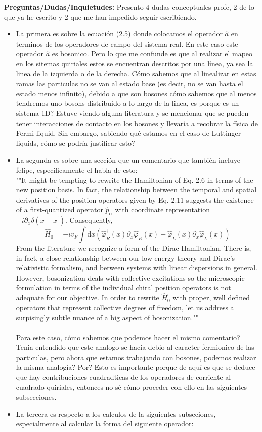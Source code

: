     
\textcolor{UVred}{\textbf{Preguntas/Dudas/Inquietudes:}}
Presento 4 dudas conceptuales profe, 2 de lo que ya he escrito y 2 que me han impedido seguir escribiendo.
\begin{itemize}
    \item La primera es sobre la ecuación (2.5) donde colocamos el operador $\hat{a}$ en terminos de los operadores de campo del sistema real. En este caso este operador $\hat{a}$ es bosonico. Pero lo que me confunde es que al realizar el mapeo en los sitemas quiriales estos se encuentran descritos por una línea, ya sea la linea de la izquierda o de la derecha. Cómo sabemos que al linealizar en estas ramas las particulas no se van al estado base (es decir, no se van hasta el estado menos infinito), debido a que son bosones cómo sabemos que al menos tendremos uno bosons distribuido a lo largo de la linea, es porque es un sistema 1D? Estuve viendo alguna literatura y se mencionar que se pueden tener interacciones de contacto en los bosones y llevaría a recobrar la física de Fermi-liquid. Sin embargo, sabiendo qué estamos en el caso de Luttinger liquids, cómo se podría justificar esto?
    \item  La segunda es sobre una sección que un comentario que también incluye felipe, especificamente el habla de esto:\\
""It might be tempting to rewrite the Hamiltonian of Eq. 2.6 in terms of the new position basis. In fact, the relationship between the temporal and spatial derivatives of the position operators given by Eq. 2.11 suggests the existence of a first-quantized operator $\hat{p}_{\alpha}$ with coordinate representation $-i \partial_{x} \delta\left(x-x^{\prime}\right)$. Consequently,
$$
\hat{H}_{0}=-i v_{F} \int \mathrm{d} x\left(\hat{\varphi}_{R}^{\dagger}(x) \partial_{x} \hat{\varphi}_{R}(x)-\hat{\varphi}_{L}^{\dagger}(x) \partial_{x} \hat{\varphi}_{L}(x)\right)
$$
From the literature we recognize a form of the Dirac Hamiltonian. There is, in fact, a close relationship between our low-energy theory and Dirac's relativistic formalism, and between systems with linear dispersions in general. However, bosonization deals with collective excitations so the microscopic formulation in terms of the individual chiral position operators is not adequate for our objective. In order to rewrite $\hat{H}_{0}$ with proper, well defined operators that represent collective degrees of freedom, let us address a surpisingly subtle nuance of a big aspect of bosonization."" \\ \\
Para este caso, cómo sabemos que podemos hacer el mismo comentario? Tenia entendido que este analogo se hacia debio al caracter fermionico de las particulas, pero ahora que estamos trabajando con bosones, podemos realizar la misma analogía? Por? Esto es importante porque de aquí es que se deduce que hay contribuciones cuadradticas de los operadores de corriente al cuadrado quiriales, entonces no sé cómo proceder con ello en las siguientes subsecciones.     
    \item  La tercera es respecto a los calculos de la siguientes subseciones, especialmente al calcular la forma del siguiente operador:
    


\end{itemize}
